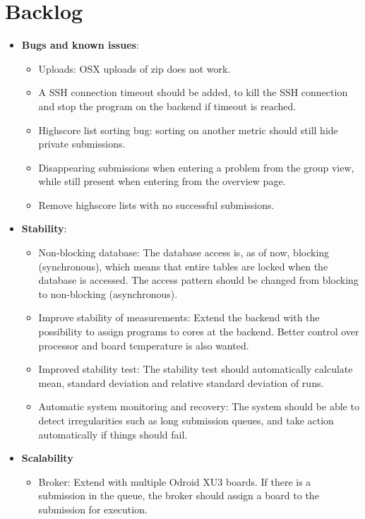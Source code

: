 \chapter{Backlog}
\label{apdx:backlog}

\begin{itemize}
\item \textbf{Bugs and known issues}:
    \begin{itemize}
        \item Uploads: OSX uploads of zip does not work.
        \item A SSH connection timeout should be added, to kill the SSH connection and stop the program on the backend if timeout is reached.
        \item Highscore list sorting bug: sorting on another metric should still hide private submissions.
        \item Disappearing submissions when entering a problem from the group view, while still present when entering from the overview page.
        \item Remove highscore lists with no successful submissions.
    \end{itemize}
\item \textbf{Stability}:
    \begin{itemize}
        \item Non-blocking database: The database access is, as of now, blocking (synchronous), which means that entire tables are locked when the database is accessed. The access pattern should be changed from blocking to non-blocking (asynchronous).
        \item Improve stability of measurements: Extend the backend with the possibility to assign programs to cores at the backend. Better control over processor and board temperature is also wanted.
        \item Improved stability test: The stability test should automatically calculate mean, standard deviation and relative standard deviation of runs.
        \item Automatic system monitoring and recovery: The system should be able to detect irregularities such as long submission queues, and take action automatically if things should fail.
    \end{itemize}
\item \textbf{Scalability}
    \begin{itemize}
        \item Broker: Extend with multiple Odroid XU3 boards. If there is a submission in the queue, the broker should assign a board to the submission for execution.

\end{itemize}
\end{itemize}
